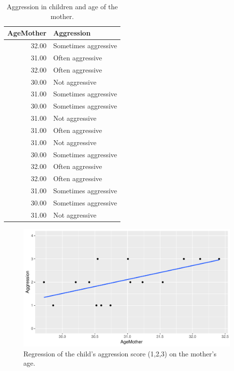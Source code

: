 \documentclass[]{report}\usepackage[]{graphicx}\usepackage[]{color}
\makeatletter
\def\maxwidth{ %
  \ifdim\Gin@nat@width>\linewidth
    \linewidth
  \else
    \Gin@nat@width
  \fi
}
\newenvironment{knitrout}{}{} %
\makeatother
\begin{document}
\begin{table}[ht]
\centering
\caption{Aggression in children and age of the mother.} 
\label{tab:nonpar_1}
\begin{tabular}{rl}
  \hline
AgeMother & Aggression \\ 
  \hline
32.00 & Sometimes aggressive \\ 
  31.00 & Often aggressive \\ 
  32.00 & Often aggressive \\ 
  30.00 & Not aggressive \\ 
  31.00 & Sometimes aggressive \\ 
  30.00 & Sometimes aggressive \\ 
  31.00 & Not aggressive \\ 
  31.00 & Often aggressive \\ 
  31.00 & Not aggressive \\ 
  30.00 & Sometimes aggressive \\ 
  32.00 & Often aggressive \\ 
  32.00 & Often aggressive \\ 
  31.00 & Sometimes aggressive \\ 
  30.00 & Sometimes aggressive \\ 
  31.00 & Not aggressive \\ 
   \hline
\end{tabular}
\end{table}




\begin{knitrout}
\color{fgcolor}\begin{figure}

{\centering \includegraphics[width=\maxwidth]{figure/fig101-1} 

}

\caption[Regression of the child's aggression score (1,2,3) on the mother's age]{Regression of the child's aggression score (1,2,3) on the mother's age.}\label{fig:fig101}
\end{figure}


\end{knitrout}
\end{document}
